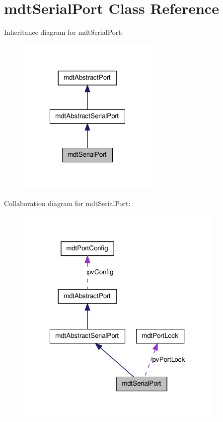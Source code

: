 \hypertarget{classmdt_serial_port}{
\section{mdtSerialPort Class Reference}
\label{classmdt_serial_port}
}


Inheritance diagram for mdtSerialPort:\nopagebreak
\begin{figure}[H]
\begin{center}
\leavevmode
\includegraphics[width=192pt]{classmdt_serial_port__inherit__graph}
\end{center}
\end{figure}


Collaboration diagram for mdtSerialPort:\nopagebreak
\begin{figure}[H]
\begin{center}
\leavevmode
\includegraphics[width=284pt]{classmdt_serial_port__coll__graph}
\end{center}
\end{figure}
